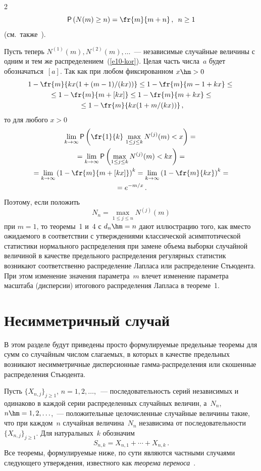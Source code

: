 \begin{multicols}{2}
\noindent
\begin{equation}
{\sf P}\left(N(m)\ge n\right)=\fr{m}{m+n}\,,\enskip  n\ge1\label{e10-kor}
\end{equation}
(см.\ так\-же~\cite[с.~85]{Nevzorov2000}).

\pagebreak

Пусть теперь $N^{(1)}(m),N^{(2)}(m),\ldots$~--- независимые
случайные величины с одним и тем же распределением~(\ref{e10-kor}). Целая
часть чис\-ла~$a$ будет обозначаться~$[a]$. Так как при любом
фиксированном $x\hm>0$
\begin{multline*}
1-\fr{m}{kx(1+(m-1)/(kx))}\le 1-\fr{m}{m-1+kx}\le{}\\
{}\le
1-\fr{m}{m+[kx]}\le  1-\fr{m}{m+kx}\le{}\\
{}\le
1-\fr{m}{kx(1+m/(kx))}\,,
\end{multline*}
то для любого $x>0$
\begin{multline*}
\lim_{k\to\infty}{\sf P}\left(\fr{1}{k}\,\max\limits_{1\le j\le k}N^{(j)}(m)<x\right)= {}\\
{}=
\lim_{k\to\infty}{\sf P}\left(\max_{1\le j\le
k}N^{(j)}(m)<kx\right)={}\\
{}=
\lim\limits_{k\to\infty}\left(1-\fr{m}{m+[kx]}\right)^k=
\lim\limits_{k\to\infty}\left(1-\fr{m}{kx}\right)^k={}\\
{}=e^{-m/x}\,.
\end{multline*}
Поэтому, если положить
$$
N_n=\max\limits_{1\le j\le n}N^{(j)}(m)
$$
при $m=1$, то теоремы~1 и~4 с $d_n\hm=n$ дают иллюстрацию того, как
вместо ожидаемого в соответствии с утверждениями классической
асимптотической статистики нормального распределения при замене
объема выборки случайной величиной в качестве предельного
распределения регулярных статистик возникают соответственно
распределение Лапласа или распределение Стьюдента. При этом
изменение значения параметра~$m$ влечет изменение параметра
масштаба (дисперсии) итогового распределения Лапласа в теореме~1.

\section{Несимметричный случай}

В этом разделе будут приведены просто формулируемые предельные
теоремы для сумм со случайным числом слагаемых, в которых в
качестве предель\-ных возникают несимметричные дисперсионные
гам\-ма-рас\-пре\-де\-ле\-ния или скошенные распределения Стьюдента.

Пусть $\{X_{n,j}\}_{j\ge1}$, $n=1,2,\ldots ,$~--- последовательность
серий независимых и одинаково в каждой серии распределенных
случайных величин, а~$N_n$, $n\hm=1,2,\ldots$,~--- положительные
целочисленные случайные величины такие, что при каждом~$n$
случайная величина~$N_n$ независима от по\-сле\-до\-ва\-тель\-ности
$\{X_{n,j}\}_{j\ge1}$. Для натуральных~$k$ обозначим
$$
S_{n,k}=X_{n,1}+\cdots+X_{n,k}\,.
$$
Все теоремы,
фор\-му\-ли\-ру\-емые ниже, по сути являются частными случаями следующего
утверждения, известного как \textit{теорема переноса}~\cite{GnedenkoFahim1969}.


\end{multicols}
